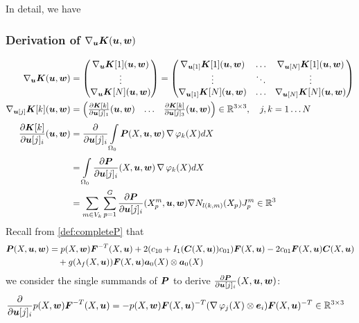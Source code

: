 In detail, we have
\subsubsection{Derivation of $\nabla_{\vu}\vK(\vu,\vw)$}
\begin{align*}
	\nabla_{\vu}\vK(\vu,\vw) &= \m{\nabla_{\vu}\vK[1](\vu,\vw)\\ \vdots \\ \nabla_{\vu}\vK[N](\vu,\vw)}
	 = \m{\nabla_{\vu[1]}\vK[1](\vu,\vw) & \ldots & \nabla_{\vu[N]}\vK[1](\vu,\vw)\\
	 	\vdots & \ddots & \vdots\\
	   \nabla_{\vu[1]}\vK[N](\vu,\vw) & \ldots & \nabla_{\vu[N]}\vK[N](\vu,\vw)}\\
	\nabla_{\vu[j]}\vK[k](\vu,\vw) &=\m{\d{\vK[k]}{\vu[j]_1}(\vu,\vw) & \ldots & \d{\vK[k]}{\vu[j]_3}(\vu,\vw)}\in\R^{3\times 3},\quad j,k=1\ldots N\\
	\d{\vK[k]}{\vu[j]_i}(\vu,\vw) &= \d{}{\vu[j]_i} \intor\vP(X,\vu,\vw)\divergence\varphi_k(X) dX\\
		&=  \intor\d{\vP}{\vu[j]_i}(X,\vu,\vw) \divergence\varphi_k(X) dX\\
		&= \sumvk\sumgp \d{\vP}{\vu[j]_i}(\pmp,\vu,\vw) \nabla N_{l(k,m)}(X_p)\jmp\in\R^3
\end{align*}
Recall from \eqref{def:completeP} that
\begin{align*}
\vP(X,\vu,\vw) &= p(X,\vw)\vF^{-T}(X,\vu) + 2(c_{10} + I_1(\vC(X,\vu))c_{01})\vF(X,\vu) - 2c_{01}\vF(X,\vu)\vC(X,\vu)\\
	     &\quad+g(\lambda_f(X,\vu))\vF(X,\vu)\va_0(X)\otimes\va_0(X)
\end{align*}
we consider the single summands of $\vP$ to derive $\d{\vP}{\vu[j]_i}(X,\vu,\vw)$:
\begin{align*}
	 \d{}{\vu[j]_i}p(X,\vw)\vF^{-T}(X,\vu) &= -p(X,\vw)\vF(X,\vu)^{-T}(\divergence\varphi_j(X)\otimes\ve_i)\vF(X,\vu)^{-T}\in\R^{3\times 3}
\end{align*}
